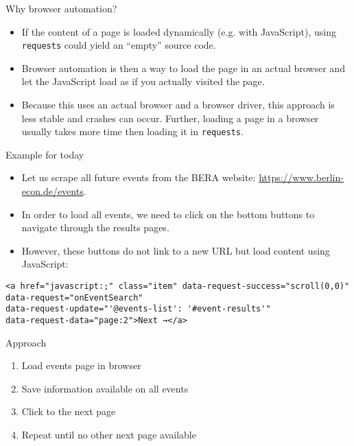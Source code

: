 \begin{frame}[fragile]{Why browser automation?}
\begin{itemize}
	\item If the content of a page is loaded dynamically (e.g. with JavaScript), using \verb!requests! could yield an ``empty'' source code.
	\item Browser automation is then a way to load the page in an actual browser and let the JavaScript load as if you actually visited the page.
	\item Because this uses an actual browser and a browser driver, this approach is less stable and crashes can occur. Further, loading a page in a browser usually takes more time then loading it in \verb!requests!.
\end{itemize}
\end{frame}

\begin{frame}[fragile]{Example for today}
\begin{itemize}
	\item Let us scrape all future events from the BERA website: \url{https://www.berlin-econ.de/events}.
	\item In order to load all events, we need to click on the bottom buttons to navigate through the results pages.
	\item However, these buttons do not link to a new URL but load content using JavaScript:
\end{itemize}
\begin{verbatim}
<a href="javascript:;" class="item" data-request-success="scroll(0,0)" 
data-request="onEventSearch" 
data-request-update="'@events-list': '#event-results'" 
data-request-data="page:2">Next →</a>
\end{verbatim}
\end{frame}

\begin{frame}{Approach}
\begin{enumerate}
	\item Load events page in browser
	\item Save information available on all events
	\item Click to the next page
	\item Repeat until no other next page available
\end{enumerate}
\end{frame}